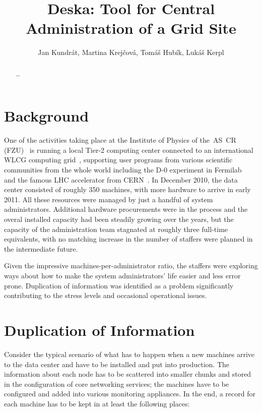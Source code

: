 \documentclass[a4paper]{jpconf}
\begin{document}
\title{Deska: Tool for Central Administration of a Grid Site}
\author{Jan Kundrát, Martina Krejčová, Tomáš Hubík, Lukáš Kerpl}
\address{Institute of Physics, AS CR, Na Slovance 22, 182 21, Prague, Czech
Republic}

\begin{abstract}
    \ldots
\end{abstract}

\section{Background}

One of the activities taking place at the Institute of Physics of the~AS~CR (FZU)~\cite{fzu} is running a local Tier-2 computing
center connected to an international WLCG computing grid~\cite{wlcg}, supporting user programs from various scientific communities
from the whole world including the D-0 experiment in Fermilab~\cite{d0} and the famous LHC accelerator from CERN~\cite{lhc}.
In December 2010, the data center consisted of roughly 350 machines, with more hardware to arrive in early 2011.  All these resources
were managed by just a handful of system administrators.  Additional hardware procurements were in the process and the overal installed
capacity had been steadily growing over the years, but the capacity of the administration team stagnated at roughly three full-time
equivalents, with no matching increase in the number of staffers were planned in the intermediate future.

Given the impressive machines-per-administrator ratio, the staffers were exploring ways about how to make the system administrators'
life easier and less error prone.  Duplication of information was identified as a problem significantly contributing to the stress
levels and occasional operational issues.

\section{Duplication of Information}

Consider the typical scenario of what has to happen when a new machines arrive to the data center and have to be installed and put into
production.  The information about each node has to be scattered into smaller chunks and stored in the configuration of core networking
services; the machines have to be configured and added into various monitoring appliances.  In the end, a record for each machine has
to be kept in at least the following places:
\end{document}
